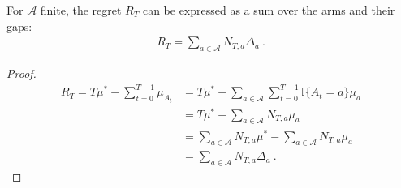 \begin{lemma}\label{lem:regret_eq_sum_pullCount_mul_gap}
  \leanok
For $\mathcal{A}$ finite, the regret $R_T$ can be expressed as a sum over the arms and their gaps:
\begin{align*}
  R_T = \sum_{a \in \mathcal{A}} N_{T,a} \Delta_a \: .
\end{align*}
\end{lemma}

\begin{proof}
  \leanok
\begin{align*}
  R_T = T \mu^* - \sum_{t=0}^{T-1} \mu_{A_t}
  &= T \mu^* - \sum_{a \in \mathcal{A}} \sum_{t=0}^{T-1} \mathbb{I}\{A_t = a\} \mu_a
  \\
  &= T \mu^* - \sum_{a \in \mathcal{A}} N_{T,a} \mu_a
  \\
  &= \sum_{a \in \mathcal{A}} N_{T,a} \mu^* - \sum_{a \in \mathcal{A}} N_{T,a} \mu_a
  \\
  &= \sum_{a \in \mathcal{A}} N_{T,a} \Delta_a
  \: .
\end{align*}
\end{proof}
